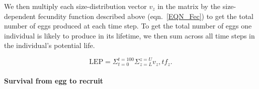 \documentclass[12pt, oneside]{article}   	%
\begin{document}




We then multiply each size-distribution vector $v_z$ in the matrix by the size-dependent fecundity function described above (eqn.\ \ref{EQN_Fec}) to get the total number of eggs produced at each time step. To get the total number of eggs one individual is likely to produce in its lifetime, we then sum across all time steps in the individual's potential life.  

\begin{equation} %
\text{LEP} = \Sigma_{t=0}^{t=100} \Sigma_{z=L}^{z=U} v_z,t f_z. \label{EQN_LEP}
\end{equation}

\paragraph*{Survival from egg to recruit}
\end{document}

